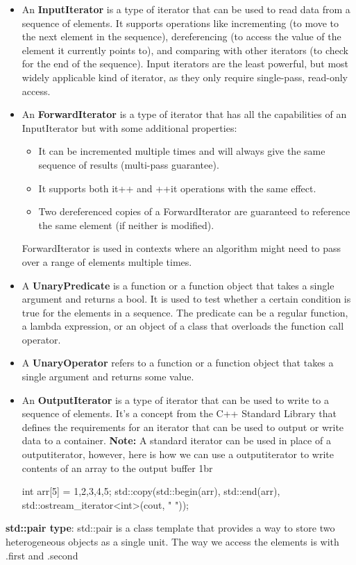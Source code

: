 \documentclass{report}
\begin{document}
    \begin{itemize}
        \item An \textbf{InputIterator} is a type of iterator that can be used to read data from a sequence of elements. It supports operations like incrementing (to move to the next element in the sequence), dereferencing (to access the value of the element it currently points to), and comparing with other iterators (to check for the end of the sequence). Input iterators are the least powerful, but most widely applicable kind of iterator, as they only require single-pass, read-only access.
        \item An \textbf{ForwardIterator} is a type of iterator that has all the capabilities of an InputIterator but with some additional properties:
            \begin{itemize}
                \item It can be incremented multiple times and will always give the same sequence of results (multi-pass guarantee).
                \item It supports both it++ and ++it operations with the same effect.
                \item Two dereferenced copies of a ForwardIterator are guaranteed to reference the same element (if neither is modified).
            \end{itemize}
            ForwardIterator is used in contexts where an algorithm might need to pass over a range of elements multiple times.
        \item A \textbf{UnaryPredicate} is a function or a function object that takes a single argument and returns a bool. It is used to test whether a certain condition is true for the elements in a sequence. The predicate can be a regular function, a lambda expression, or an object of a class that overloads the function call operator.
        \item A \textbf{UnaryOperator} refers to a function or a function object that takes a single argument and returns some value.
        \item An \textbf{OutputIterator} is a type of iterator that can be used to write to a sequence of elements. It's a concept from the C++ Standard Library that defines the requirements for an iterator that can be used to output or write data to a container. 
            \bigbreak \noindent 
            \textbf{Note:} A standard iterator can be used in place of a outputiterator, however, here is how we can use a outputiterator to write contents of an array to the output buffer
            1br
            \begin{cppcode}
                int arr[5] = {1,2,3,4,5};
                std::copy(std::begin(arr), std::end(arr), std::ostream_iterator<int>(cout, " "));
            \end{cppcode}
    \end{itemize}
    \bigbreak \noindent  
    \textbf{std::pair type}: std::pair is a class template that provides a way to store two heterogeneous objects as a single unit. The way we access the elements is with .first and .second
\end{document}
